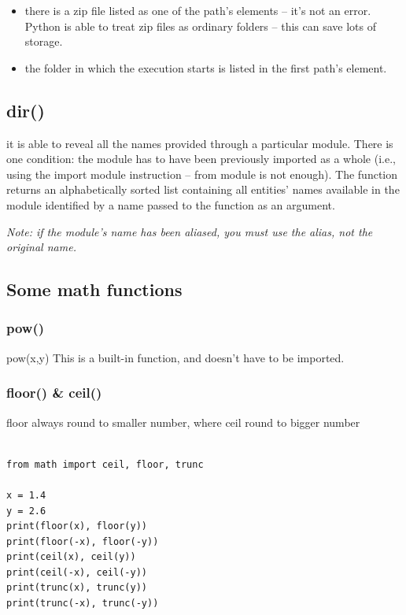 \documentclass[11pt]{article}
\begin{document}
\begin{itemize}
\item there is a zip file listed as one of the path’s elements – it’s not
an error. Python is able to treat zip files as ordinary folders –
this can save lots of storage.
\item the folder in which the execution starts is listed in the first
path’s element.
\end{itemize}

\subsection{dir()}
\label{sec:orge37cb12}
it is able to reveal all the names provided through a particular
module. There is one condition: the module has to have been previously
imported as a whole (i.e., using the import module instruction – from
module is not enough).  The function returns an alphabetically sorted
list containing all entities’ names available in the module identified
by a name passed to the function as an argument. 

\emph{Note: if the module’s name has been aliased, you must use the alias,
not the original name.}

\subsection{Some math functions}
\label{sec:org14084d8}
\subsubsection{pow()}
\label{sec:org5e1439a}
pow(x,y) This is a built-in function, and doesn’t have to be imported.
\subsubsection{floor() \& ceil()}
\label{sec:org5d14dbc}
floor always round to smaller number, where ceil round to bigger number

\begin{verbatim}

from math import ceil, floor, trunc

x = 1.4
y = 2.6
print(floor(x), floor(y))
print(floor(-x), floor(-y))
print(ceil(x), ceil(y))
print(ceil(-x), ceil(-y))
print(trunc(x), trunc(y))
print(trunc(-x), trunc(-y))

\end{verbatim}
\end{document}
